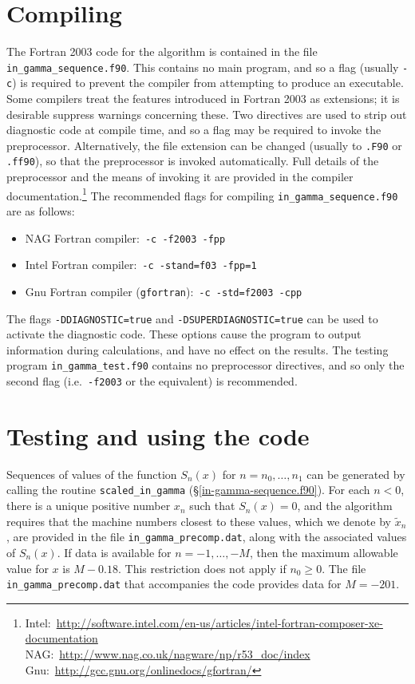 \documentclass[paper=a4,smallheadings]{scrartcl}
\begin{document}
\section{Compiling}
The Fortran 2003 code for the algorithm is contained in the file
\texttt{in\_gamma\_sequence.f90}. This contains no main program, and
so a flag (usually \texttt{-c}) is required to prevent the compiler
from attempting to produce an executable.  Some compilers treat the
features introduced in Fortran 2003 as extensions; it is desirable
suppress warnings concerning these.  Two directives are used to strip
out diagnostic code at compile time, and so a flag may be required to
invoke the preprocessor. Alternatively, the file extension can be
changed (usually to \texttt{.F90} or \texttt{.ff90}), so that the
preprocessor is invoked automatically.  Full details of the preprocessor
and the means of invoking it are provided in the compiler documentation.\footnote{%
Intel:\ \url{http://software.intel.com/en-us/articles/intel-fortran-composer-xe-documentation} \\
NAG:\ \url{http://www.nag.co.uk/nagware/np/r53_doc/index} \\
Gnu:\ \url{http://gcc.gnu.org/onlinedocs/gfortran/}
}
The recommended flags for compiling \texttt{in\_gamma\_sequence.f90} are
as follows:
\begin{itemize}
\item NAG Fortran compiler:\ \texttt{-c -f2003 -fpp}
\item Intel Fortran compiler:\ \texttt{-c -stand=f03 -fpp=1}
\item Gnu Fortran compiler (\texttt{gfortran}):\ \texttt{-c -std=f2003 -cpp}
\end{itemize}
The flags \texttt{-DDIAGNOSTIC=true} and
\texttt{-DSUPERDIAGNOSTIC=true} can be used to activate the diagnostic
code. These options cause the program to output information during
calculations, and have no effect on the results.
The testing program \texttt{in\_gamma\_test.f90} contains no
preprocessor directives, and so only the second flag
(i.e.\ \texttt{-f2003} or the equivalent) is recommended.
%
\section{Testing and using the code}
\label{sec:using}
Sequences of values of the function $S_n(x)$ for $n=n_0,\ldots,n_1$
can be generated by calling the routine \texttt{scaled\_in\_gamma}
(\S\ref{in-gamma-sequence.f90}). For each $n<0$, there is a unique
positive number $x_n$ such that $S_n(x)=0$, and the algorithm requires
that the machine numbers closest to these values, which we denote by
$\tilde{x}_n$, are provided in the file \texttt{in\_gamma\_precomp.dat},
along with the associated values of $S_n(x)$. If data is available for
$n=-1,\ldots,-M$, then the maximum allowable value for $x$ is
$M-0.18$. This restriction does not apply if $n_0\ge0$.  The file
\texttt{in\_gamma\_precomp.dat} that accompanies the code provides
data for $M=-201$.
\end{document}
